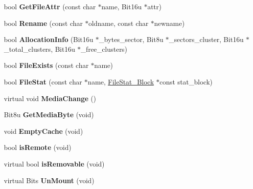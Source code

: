 \begin{DoxyCompactItemize}
\item 
\hypertarget{classVirtual__Drive_ac5a26ae326fe4ef86c3aeeab030640db}{bool {\bfseries Get\-File\-Attr} (const char $\ast$name, Bit16u $\ast$attr)}\label{classVirtual__Drive_ac5a26ae326fe4ef86c3aeeab030640db}

\item 
\hypertarget{classVirtual__Drive_a5bafd492b22e85790ab37c94a1dd3d6b}{bool {\bfseries Rename} (const char $\ast$oldname, const char $\ast$newname)}\label{classVirtual__Drive_a5bafd492b22e85790ab37c94a1dd3d6b}

\item 
\hypertarget{classVirtual__Drive_afc40a6c58322450b7926af869f8552b5}{bool {\bfseries Allocation\-Info} (Bit16u $\ast$\-\_\-bytes\-\_\-sector, Bit8u $\ast$\-\_\-sectors\-\_\-cluster, Bit16u $\ast$\-\_\-total\-\_\-clusters, Bit16u $\ast$\-\_\-free\-\_\-clusters)}\label{classVirtual__Drive_afc40a6c58322450b7926af869f8552b5}

\item 
\hypertarget{classVirtual__Drive_a042c9df503a6929b8be4eb5c4ccb9d34}{bool {\bfseries File\-Exists} (const char $\ast$name)}\label{classVirtual__Drive_a042c9df503a6929b8be4eb5c4ccb9d34}

\item 
\hypertarget{classVirtual__Drive_ac1b5aa7a3e96c789a357eacacdbafee9}{bool {\bfseries File\-Stat} (const char $\ast$name, \hyperlink{structFileStat__Block}{File\-Stat\-\_\-\-Block} $\ast$const stat\-\_\-block)}\label{classVirtual__Drive_ac1b5aa7a3e96c789a357eacacdbafee9}

\item 
\hypertarget{classVirtual__Drive_a60c747bf84748c41f6489a85e354ce53}{virtual void {\bfseries Media\-Change} ()}\label{classVirtual__Drive_a60c747bf84748c41f6489a85e354ce53}

\item 
\hypertarget{classVirtual__Drive_a204a007b01b36835353da1cfe602f347}{Bit8u {\bfseries Get\-Media\-Byte} (void)}\label{classVirtual__Drive_a204a007b01b36835353da1cfe602f347}

\item 
\hypertarget{classVirtual__Drive_a07c23b86ce90e36cf6bfe57e700ef24f}{void {\bfseries Empty\-Cache} (void)}\label{classVirtual__Drive_a07c23b86ce90e36cf6bfe57e700ef24f}

\item 
\hypertarget{classVirtual__Drive_adaf2f6f0157674dc2dc1a27f190d6413}{bool {\bfseries is\-Remote} (void)}\label{classVirtual__Drive_adaf2f6f0157674dc2dc1a27f190d6413}

\item 
\hypertarget{classVirtual__Drive_a0be0807a2cc522a60baed239a2c420fb}{virtual bool {\bfseries is\-Removable} (void)}\label{classVirtual__Drive_a0be0807a2cc522a60baed239a2c420fb}

\item 
\hypertarget{classVirtual__Drive_acc65a1146b71de3da99281217bacbb65}{virtual Bits {\bfseries Un\-Mount} (void)}\label{classVirtual__Drive_acc65a1146b71de3da99281217bacbb65}

\end{DoxyCompactItemize}


